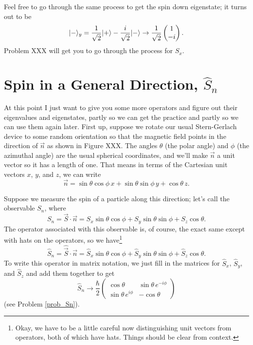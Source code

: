 Feel free to go through the same process to get the spin down eigenstate; it turns out to be
\begin{equation}
| - \rangle_y = \frac{1}{\sqrt{2}} | + \rangle - \frac{i}{\sqrt{2}} | - \rangle \to \frac{1}{\sqrt{2}} \begin{pmatrix} 1 \\ -i \end{pmatrix}.
\end{equation}
Problem XXX will get you to go through the process for $S_x$.



\section{Spin in a General Direction, $\hat{S}_n$}

At this point I just want to give you some more operators and figure out their eigenvalues and eigenstates, partly so we can get the practice and partly so we can use them again later.  First up, suppose we rotate our usual Stern-Gerlach device to some random orientation so that the magnetic field points in the direction of $\vec{n}$ as shown in Figure XXX.  The angles $\theta$ (the polar angle) and $\phi$ (the azimuthal angle) are the usual spherical coordinates, and we'll make $\vec{n}$ a unit vector so it has a length of one.  That means in terms of the Cartesian unit vectors $\unit{x}$, $\unit{y}$, and $\unit{z}$, we can write
\begin{equation}
\vec{n} = \sin \theta \cos \phi \, \unit{x} + \sin \theta \sin \phi \, \unit{y} + \cos \theta \, \unit{z}.
\end{equation}

Suppose we measure the spin of a particle along this direction; let's call the observable $S_n$, where
\begin{equation}
S_n = \vec{S} \cdot \vec{n} = S_x \sin \theta \cos \phi  + S_y \sin \theta \sin \phi + S_z \cos \theta.
\end{equation}
The operator associated with this observable is, of course, the exact same except with hats on the operators, so we have\footnote{Okay, we have to be a little careful now distinguishing unit vectors from operators, both of which have hats.  Things should be clear from context.}
\begin{equation}
\label{eq_Sn}
\hat{S}_n = \hat{\vec{S}} \cdot \vec{n} = \hat{S}_x \sin \theta \cos \phi  + \hat{S}_y \sin \theta \sin \phi  + \hat{S}_z \cos \theta.
\end{equation}
To write this operator in matrix notation, we just fill in the matrices for $\hat{S}_x$, $\hat{S}_y$, and $\hat{S}_z$ and add them together to get
\begin{equation}
\label{eq_Sn_matrix}
\hat{S}_n \to \frac{\hbar}{2} \begin{pmatrix} \cos \theta & \sin \theta \, e^{-i\phi} \\ \sin \theta \, e^{i\phi} & -\cos \theta \end{pmatrix}
\end{equation}
(see Problem \ref{prob_Sn}).

